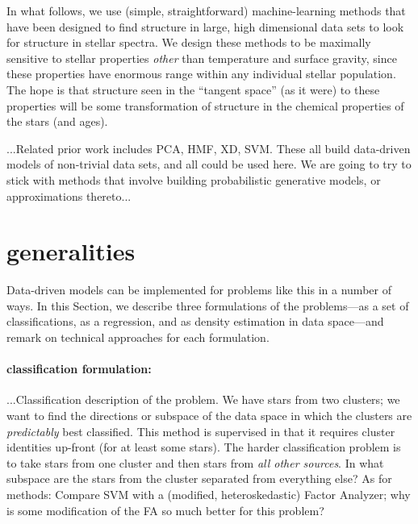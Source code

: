 \documentclass[12pt, preprint]{aastex}
\newcommand{\sectionname}{Section}
\begin{document}
In what follows, we use (simple, straightforward) machine-learning
methods that have been designed to find structure in large, high
dimensional data sets to look for structure in stellar spectra.
We design these methods to be maximally sensitive to stellar
properties \emph{other} than temperature and surface gravity, since
these properties have enormous range within any individual stellar
population.
The hope is that structure seen in the ``tangent space'' (as it were)
to these properties will be some transformation of structure in the
chemical properties of the stars (and ages).

...Related prior work includes PCA, HMF, XD, SVM.  These all build
data-driven models of non-trivial data sets, and all could be used
here.  We are going to try to stick with methods that involve building
probabilistic generative models, or approximations thereto...

\section{generalities}

Data-driven models can be implemented for problems like this in a
number of ways.  In this \sectionname, we describe three formulations
of the problems---as a set of classifications, as a regression, and as
density estimation in data space---and remark on technical approaches
for each formulation.

\paragraph{classification formulation:}
...Classification description of the problem.  We have stars from two
clusters; we want to find the directions or subspace of the data space
in which the clusters are \emph{predictably} best classified.  This
method is supervised in that it requires cluster identities up-front
(for at least some stars).  The harder classification problem is to
take stars from one cluster and then stars from \emph{all other
  sources}.  In what subspace are the stars from the cluster separated
from everything else?  As for methods: Compare SVM with a (modified,
heteroskedastic) Factor Analyzer; why is some modification of the FA
so much better for this problem?
\end{document}
